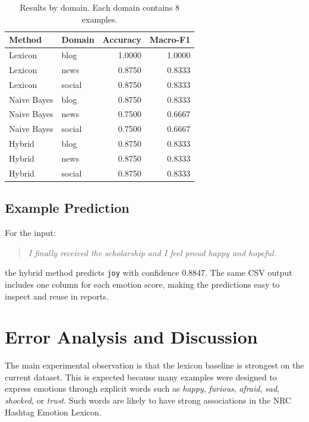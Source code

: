 \documentclass[11pt]{article}
\begin{document}
\begin{table}[h]
\centering
\small
\begin{tabular}{llrr}
\toprule
\textbf{Method} & \textbf{Domain} & \textbf{Accuracy} & \textbf{Macro-F1} \\
\midrule
Lexicon & blog & 1.0000 & 1.0000 \\
Lexicon & news & 0.8750 & 0.8333 \\
Lexicon & social & 0.8750 & 0.8333 \\
Naive Bayes & blog & 0.8750 & 0.8333 \\
Naive Bayes & news & 0.7500 & 0.6667 \\
Naive Bayes & social & 0.7500 & 0.6667 \\
Hybrid & blog & 0.8750 & 0.8333 \\
Hybrid & news & 0.8750 & 0.8333 \\
Hybrid & social & 0.8750 & 0.8333 \\
\bottomrule
\end{tabular}
\caption{Results by domain. Each domain contains 8 examples.}
\label{tab:domain-results}
\end{table}

\subsection{Example Prediction}

For the input:

\begin{quote}
\textit{I finally received the scholarship and I feel proud happy and hopeful.}
\end{quote}

the hybrid method predicts \texttt{joy} with confidence 0.8847. The same CSV output includes one column for each emotion score, making the predictions easy to inspect and reuse in reports.

\section{Error Analysis and Discussion}

The main experimental observation is that the lexicon baseline is strongest on the current dataset. This is expected because many examples were designed to express emotions through explicit words such as \textit{happy}, \textit{furious}, \textit{afraid}, \textit{sad}, \textit{shocked}, or \textit{trust}. Such words are likely to have strong associations in the NRC Hashtag Emotion Lexicon.
\end{document}
